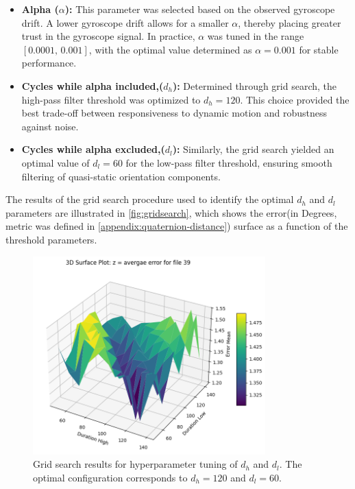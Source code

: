 \documentclass{iutbscthesis}
\begin{document}
\begin{itemize}
    \item \textbf{Alpha ($\alpha$):} This parameter was selected based on the observed gyroscope drift. A lower gyroscope drift allows for a smaller $\alpha$, thereby placing greater trust in the gyroscope signal. In practice, $\alpha$ was tuned in the range $[0.0001,\,0.001]$, with the optimal value determined as $\alpha = 0.001$ for stable performance.
    
    \item \textbf{Cycles while alpha included,($d_h$):} Determined through grid search, the high-pass filter threshold was optimized to $d_h = 120$. This choice provided the best trade-off between responsiveness to dynamic motion and robustness against noise.
    
    \item \textbf{Cycles while alpha excluded,($d_l$):} Similarly, the grid search yielded an optimal value of $d_l = 60$ for the low-pass filter threshold, ensuring smooth filtering of quasi-static orientation components.
\end{itemize}

The results of the grid search procedure used to identify the optimal $d_h$ and $d_l$ parameters are illustrated in \autoref{fig:gridsearch}, which shows the error(in Degrees, metric was defined in \autoref{appendix:quaternion-distance}) surface as a function of the threshold parameters.

\begin{figure}[h!]
    \centering
    \includegraphics[width=0.8\textwidth]{figures/DH_DL_surface.png}
    \caption{Grid search results for hyperparameter tuning of $d_h$ and $d_l$. The optimal configuration corresponds to $d_h = 120$ and $d_l = 60$.}
    \label{fig:gridsearch}
\end{figure}
\end{document}
